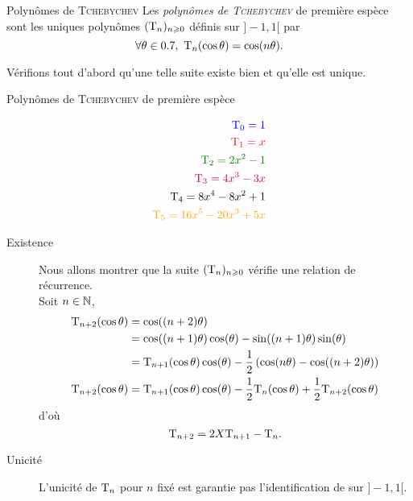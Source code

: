 \begin{defi}{Polynômes de \textsc{Tchebychev}}
    Les \emph{polynômes de \textsc{Tchebychev}} de première espèce sont les uniques polynômes $(\mathrm{T}_n)_{n \geqslant 0}$ définis sur $]-1, 1[$ par
    $$\forall \theta \in 0.7,\ \mathrm{T}_n (\cos \theta) = \cos(n \theta).$$
\end{defi}

Vérifions tout d'abord qu'une telle suite existe bien et qu'elle est unique.

\begin{marginfigure}[-4.5cm]
    \centering
	
	\caption*{\centering Polynômes de \textsc{Tchebychev} de première espèce}
	\begin{align*}
	   	\color{blue} \Tcheby_0 = 1 \\
    	\color{red} \Tcheby_1 = x \\
    	\color{green} \Tcheby_2 = 2x^2-1 \\
    	\color{purple} \Tcheby_3 = 4x^3-3x \\
    	\color{black} \Tcheby_4 = 8x^4-8x^2+1 \\
    	\color{orange} \Tcheby_5 = 16x^5-20x^3+5x
	\end{align*}
\end{marginfigure}

\begin{preuve}
    \begin{description}
        \item[Existence] Nous allons montrer que la suite $(\mathrm{T}_n)_{n \geqslant 0}$ vérifie une relation de récurrence. \\
        Soit $n \in \mathbb{N}$,
        \begin{align*}
            \mathrm{T}_{n+2}(\cos \theta) &= \cos((n+2) \theta) \\
            &= \cos((n+1) \theta) \cos(\theta) - \sin((n+1) \theta) \sin(\theta) \\
            &= \mathrm{T}_{n+1}(\cos \theta) \cos(\theta) - \frac{1}{2} \left(\cos(n \theta) - \cos((n+2)\theta)\right) \\
            \mathrm{T}_{n+2}(\cos \theta) &= \mathrm{T}_{n+1}(\cos \theta) \cos(\theta) - \frac{1}{2} \mathrm{T}_n(\cos \theta) + \frac{1}{2} \mathrm{T}_{n+2}(\cos \theta)
        \end{align*}
        d'où
        $$\mathrm{T}_{n+2} = 2X \mathrm{T}_{n+1} - \mathrm{T}_n.$$
        \item[Unicité] L'unicité de $\mathrm{T}_n$ pour $n$ fixé est garantie pas l'identification de  sur $]-1, 1[$. 
    \end{description}
\end{preuve}

